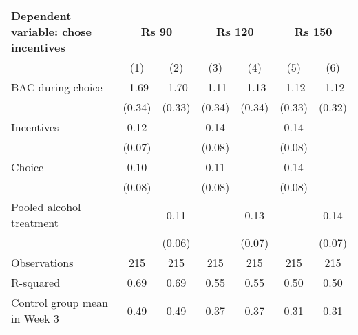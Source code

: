 \begin{tabular}{l c c c c c c} \toprule \textbf{Dependent variable: chose incentives} & \multicolumn{2}{c}{\textbf{Rs 90}} & \multicolumn{2}{c}{\textbf{Rs 120}} & \multicolumn{2}{c}{\textbf{Rs 150}} \\ \cmidrule(lr){2-3} \cmidrule(lr){4-5} \cmidrule(lr){6-7}&\multicolumn{1}{c}{(1)}&\multicolumn{1}{c}{(2)}&\multicolumn{1}{c}{(3)}&\multicolumn{1}{c}{(4)}&\multicolumn{1}{c}{(5)}&\multicolumn{1}{c}{(6)}\\
\midrule
BAC during choice   &       -1.69&       -1.70&       -1.11&       -1.13&       -1.12&       -1.12\\
                    &      (0.34)&      (0.33)&      (0.34)&      (0.34)&      (0.33)&      (0.32)\\
\addlinespace
Incentives          &        0.12&            &        0.14&            &        0.14&            \\
                    &      (0.07)&            &      (0.08)&            &      (0.08)&            \\
\addlinespace
Choice              &        0.10&            &        0.11&            &        0.14&            \\
                    &      (0.08)&            &      (0.08)&            &      (0.08)&            \\
\addlinespace
Pooled alcohol treatment&            &        0.11&            &        0.13&            &        0.14\\
                    &            &      (0.06)&            &      (0.07)&            &      (0.07)\\
\midrule
Observations        &         215&         215&         215&         215&         215&         215\\
R-squared           &        0.69&        0.69&        0.55&        0.55&        0.50&        0.50\\
Control group mean in Week 3&        0.49&        0.49&        0.37&        0.37&        0.31&        0.31\\
\bottomrule \end{tabular} 